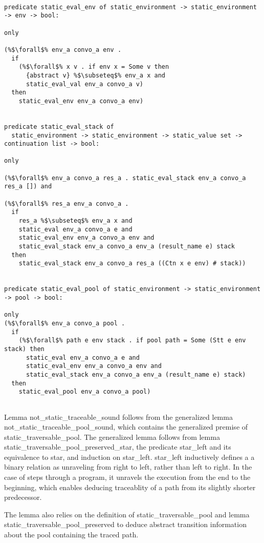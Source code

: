 \documentclass{article}
\begin{document}
\begin{lstlisting}[language=logic, style=codestyle1, escapechar=\%]

predicate static_eval_env of static_environment -> static_environment -> env -> bool:

only 

(%$\forall$% env_a convo_a env .
  if
    (%$\forall$% x v . if env x = Some v then
      {abstract v} %$\subseteq$% env_a x and
      static_eval_val env_a convo_a v)
  then 
    static_eval_env env_a convo_a env)


predicate static_eval_stack of
  static_environment -> static_environment -> static_value set -> continuation list -> bool:

only 

(%$\forall$% env_a convo_a res_a . static_eval_stack env_a convo_a res_a []) and

(%$\forall$% res_a env_a convo_a . 
  if 
    res_a %$\subseteq$% env_a x and
    static_eval env_a convo_a e and
    static_eval_env env_a convo_a env and
    static_eval_stack env_a convo_a env_a (result_name e) stack 
  then
    static_eval_stack env_a convo_a res_a ((Ctn x e env) # stack))


predicate static_eval_pool of static_environment -> static_environment -> pool -> bool:

only
(%$\forall$% env_a convo_a pool .
  if
    (%$\forall$% path e env stack . if pool path = Some (Stt e env stack) then 
      static_eval env_a convo_a e and
      static_eval_env env_a convo_a env and
      static_eval_stack env_a convo_a env_a (result_name e) stack)
  then 
    static_eval_pool env_a convo_a pool)


\end{lstlisting}
Lemma not\_static\_traceable\_sound follows from the generalized lemma
not\_static\_traceable\_pool\_sound, which contains the generalized premise of
static\_traversable\_pool. The generalized lemma follows from lemma
static\_traversable\_pool\_preserved\_star, the predicate star\_left and its equivalence to star,
and induction on star\_left. star\_left inductively defines a a binary relation as unraveling
from right to left, rather than left to right.  In the case of steps through a program, it
unravels the execution from the end to the beginning, which enables deducing traceablity of a
path from its slightly shorter predecessor.  

The lemma also relies on the definition of static\_traversable\_pool
and lemma static\_traversable\_pool\_preserved to deduce abstract transition information about the
pool containing the traced path.
\end{document}
